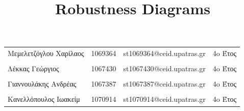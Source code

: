 \documentclass{../ol-softwaremanual}
\begin{document}
	
	
	\begin{titlepage}
		
		
		\title{\en Robustness Diagrams \\}
		
	\end{titlepage}
	
	
	\maketitle
	
	\newpage
	
	
	\vspace{20pt}
	
	
	
	\begin{table}[htbp!]
		
		\begin{tabular}{llll}
			Μεμελετζόγλου Χαρίλαος & 1069364 & \en st1069364@ceid.upatras.gr & 4o Έτος   \\ 
			\\ Λέκκας Γεώργιος      &      1067430    &   \en st1067430@ceid.upatras.gr & 4o Έτος  \\
			\\ Γιαννουλάκης Ανδρέας        &   1067387       & \en st1067387@ceid.upatras.gr & 4o Έτος           \\
			\\ Κανελλόπουλος Ιωακείμ        &  1070914        &    \en st1070914@ceid.upatras.gr & 4o Έτος        \\ 
		\end{tabular}
	\end{table}
	
\end{document}
